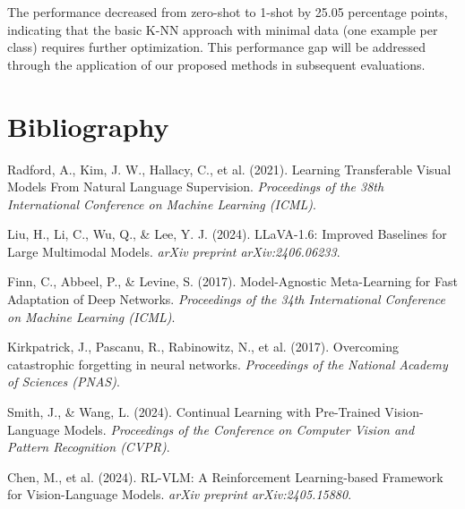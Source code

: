 \documentclass[12pt]{article}
\begin{document}
The performance decreased from zero-shot to 1-shot by 25.05 percentage points, indicating that the basic K-NN approach with minimal data (one example per class) requires further optimization. This performance gap will be addressed through the application of our proposed methods in subsequent evaluations.

\section{Bibliography}
\begin{thebibliography}{6}
Radford, A., Kim, J. W., Hallacy, C., et al. (2021).
\newblock Learning Transferable Visual Models From Natural Language Supervision.
\newblock \emph{Proceedings of the 38th International Conference on Machine Learning (ICML)}.

Liu, H., Li, C., Wu, Q., \& Lee, Y. J. (2024).
\newblock LLaVA-1.6: Improved Baselines for Large Multimodal Models.
\newblock \emph{arXiv preprint arXiv:2406.06233}.

Finn, C., Abbeel, P., \& Levine, S. (2017).
\newblock Model-Agnostic Meta-Learning for Fast Adaptation of Deep Networks.
\newblock \emph{Proceedings of the 34th International Conference on Machine Learning (ICML)}.

Kirkpatrick, J., Pascanu, R., Rabinowitz, N., et al. (2017).
\newblock Overcoming catastrophic forgetting in neural networks.
\newblock \emph{Proceedings of the National Academy of Sciences (PNAS)}.

Smith, J., \& Wang, L. (2024).
\newblock Continual Learning with Pre-Trained Vision-Language Models.
\newblock \emph{Proceedings of the Conference on Computer Vision and Pattern Recognition (CVPR)}.

Chen, M., et al. (2024).
\newblock RL-VLM: A Reinforcement Learning-based Framework for Vision-Language Models.
\newblock \emph{arXiv preprint arXiv:2405.15880}.
\end{thebibliography}
\end{document}
